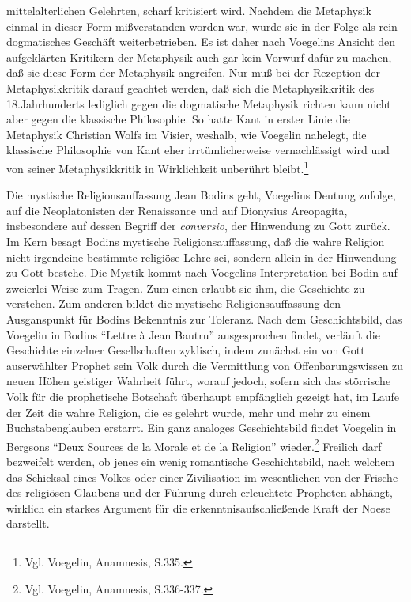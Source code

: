 mittelalterlichen Gelehrten, scharf kritisiert wird. Nachdem die
Metaphysik einmal in dieser Form mißverstanden worden war, wurde sie in
der Folge als rein dogmatisches Geschäft weiterbetrieben. Es ist daher
nach Voegelins Ansicht den aufgeklärten Kritikern der Metaphysik auch
gar kein Vorwurf dafür zu machen, daß sie diese Form der Metaphysik
angreifen. Nur muß bei der Rezeption der Metaphysikkritik darauf
geachtet werden, daß sich die Metaphysikkritik des 18.Jahrhunderts
lediglich gegen die dogmatische Metaphysik richten kann nicht aber gegen
die klassische Philosophie. So hatte Kant in erster Linie die Metaphysik
Christian Wolfs im Visier, weshalb, wie Voegelin nahelegt, die
klassische Philosophie von Kant eher irrtümlicherweise vernachlässigt
wird und von seiner Metaphysikkritik in Wirklichkeit unberührt
bleibt.\footnote{Vgl. Voegelin, Anamnesis, S.335.}

Die mystische Religionsauffassung Jean Bodins geht, Voegelins Deutung zufolge,
auf die Neoplatonisten der Renaissance und auf Dionysius Areopagita,
insbesondere auf dessen Begriff der {\it conversio}, der Hinwendung zu Gott
zurück. Im Kern besagt Bodins mystische Religionsauffassung, daß die wahre
Religion nicht irgendeine bestimmte religiöse Lehre sei, sondern allein in der
Hinwendung zu Gott bestehe. Die Mystik kommt nach Voegelins Interpretation bei
Bodin auf zweierlei Weise zum Tragen. Zum einen erlaubt sie ihm, die
Geschichte zu verstehen. Zum anderen bildet die mystische Religionsauffassung
den Ausganspunkt für Bodins Bekenntnis zur Toleranz. Nach dem Geschichtsbild,
das Voegelin in Bodins "`Lettre à Jean Bautru"' ausgesprochen findet,
verläuft die Geschichte einzelner Gesellschaften zyklisch, indem zunächst ein
von Gott auserwählter Prophet sein Volk durch die Vermittlung von
Offenbarungswissen zu neuen Höhen geistiger Wahrheit führt, worauf jedoch,
sofern sich das störrische Volk für die prophetische Botschaft überhaupt
empfänglich gezeigt hat, im Laufe der Zeit die wahre Religion, die es gelehrt
wurde, mehr und mehr zu einem Buchstabenglauben erstarrt. Ein ganz analoges
Geschichtsbild findet Voegelin in Bergsons "`Deux Sources de la Morale et de
la Religion"' wieder.\footnote{Vgl. Voegelin, Anamnesis, S.336-337.} Freilich
darf bezweifelt werden, ob jenes ein wenig romantische Geschichtsbild, nach
welchem das Schicksal eines Volkes oder einer Zivilisation im wesentlichen von
der Frische des religiösen Glaubens und der Führung durch erleuchtete
Propheten abhängt, wirklich ein starkes Argument für die
erkenntnisaufschließende Kraft der Noese darstellt.

